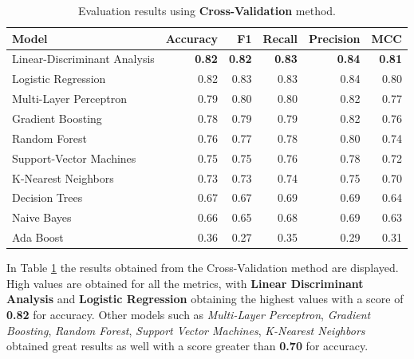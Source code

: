             \begin{table}[htbp]
                \centering
                \caption{Evaluation results using \textbf{Cross-Validation} method.}
                \label{tab:feature_engineering_approach_cv}
                \begin{tabular}{lrrrrr}
                    \toprule
                    \textbf{Model} & \textbf{Accuracy} & \textbf{F1} & \textbf{Recall} & \textbf{Precision} & \textbf{MCC} \\
                    \midrule
                    Linear-Discriminant Analysis & \textbf{0.82} & \textbf{0.82} & \textbf{0.83} & \textbf{0.84} & \textbf{0.81} \\
                    Logistic Regression & 0.82 & 0.83 & 0.83 & 0.84 & 0.80 \\
                    Multi-Layer Perceptron & 0.79 & 0.80 & 0.80 & 0.82 & 0.77 \\
                    Gradient Boosting & 0.78 & 0.79 & 0.79 & 0.82 & 0.76 \\
                    Random Forest & 0.76 & 0.77 & 0.78 & 0.80 & 0.74 \\
                    Support-Vector Machines & 0.75 & 0.75 & 0.76 & 0.78 & 0.72 \\
                    K-Nearest Neighbors & 0.73 & 0.73 & 0.74 & 0.75 & 0.70 \\
                    Decision Trees & 0.67 & 0.67 & 0.69 & 0.69 & 0.64 \\
                    Naive Bayes & 0.66 & 0.65 & 0.68 & 0.69 & 0.63 \\
                    Ada Boost & 0.36 & 0.27 & 0.35 & 0.29 & 0.31 \\
                    \bottomrule
                \end{tabular}
            \end{table}

            In Table \ref{tab:feature_engineering_approach_cv} the results obtained from the Cross-Validation method are displayed. High values are obtained for all the metrics, with \textbf{Linear Discriminant Analysis}  and \textbf{Logistic Regression} obtaining the highest values with a score of \textbf{0.82} for accuracy. Other models such as \textit{Multi-Layer Perceptron}, \textit{Gradient Boosting}, \textit{Random Forest}, \textit{Support Vector Machines}, \textit{K-Nearest Neighbors} obtained great results as well with a score greater than \textbf{0.70} for accuracy. 

